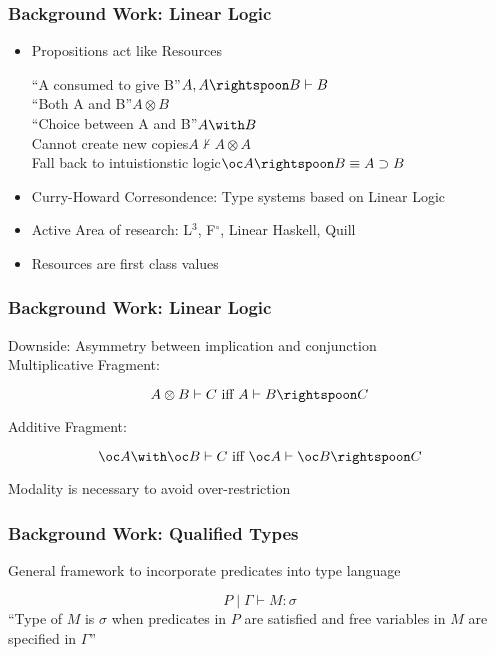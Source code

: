 \begin{frame}[fragile,c]
  \frametitle{Background Work: Linear Logic}
  \begin{itemize}
  \item<1-> Propositions act like Resources\\
    \begin{center}
      ``A consumed to give B''\quad $A, A \rightspoon B \vdash B$\\
      ``Both A and B''\quad $A \otimes B$\\
      ``Choice between A and B''\quad $A \with B$\\
    Cannot create new copies\quad $A \not\vdash A \otimes A$\\
    Fall back to intuistionstic logic\quad $\oc A \rightspoon B \equiv A \supset B$
  \end{center}
  \item<2-> Curry-Howard Corresondence: Type systems based on Linear Logic
  \item<2-> Active Area of research: L$^3$\citep{ahmed_l3_2007},
    F$^\circ$\citep{mazurak_lolliproc_2010}, Linear Haskell\citep{bernardy_linear_2017}, Quill\citep{morris_best_2016}
  \item<2-> Resources are first class values
  \end{itemize}
\end{frame}

\begin{frame}[fragile, c]
  \frametitle{Background Work: Linear Logic}
  Downside: Asymmetry between implication and conjunction\\
  Multiplicative Fragment:
  \begin{center}
    $$A \otimes B \vdash C \text{ iff } A \vdash B \rightspoon C$$
  \end{center}
  Additive Fragment:
  \begin{center}
    $$ \oc A \with \oc B \vdash C \text{ iff } \oc A \vdash \oc B \rightspoon C$$
  \end{center}
  Modality is necessary to avoid over-restriction
\end{frame}


\begin{frame}[c]
  \frametitle{Background Work: Qualified Types}
  General framework to incorporate predicates into type language
  \begin{center}
  $$P \mid \Gamma \vdash M:\sigma $$
  ``Type of $M$ is $\sigma$ when predicates in $P$ are satisfied and
  free variables in $M$ are specified in $\Gamma$''\cite{jones_theory_1994}
  \end{center}
\end{frame}


